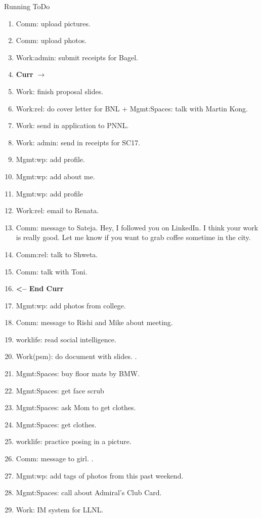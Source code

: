 \begin{columns}
\begin{column}{0.6\linewidth}
\begin{block}{Running ToDo}
\begin{enumerate}
\item \tiny Comm: upload pictures. 
\item \tiny Comm: upload photos. 

\item \tiny Work:admin: submit receipts for Bagel. 

  
\tiny \item[] \tiny \textbf{Curr} $\rightarrow$
  
\item \tiny Work: finish proposal slides. 

\item \tiny Work:rel: do cover letter for BNL + Mgmt:Spaces: talk with
  Martin Kong.
  
\item \tiny Work: send in application to PNNL.

\item \tiny Work: admin: send in receipts for SC17. 

\item \tiny Mgmt:wp: add profile.
\item \tiny Mgmt:wp: add about me. 
  
\item \tiny Mgmt:wp: add profile 
\item \tiny Work:rel: email to Renata.  
\item \tiny Comm: message to Sateja. 
  Hey, I followed you on LinkedIn. I think your work is really good. 
  Let me know if you want to grab coffee sometime in the city. 
\item \tiny Comm:rel: talk to Shweta.
\item \tiny Comm: talk with Toni. 

\item \tiny \textbf{ <-- End Curr }
      \item \tiny Mgmt:wp: add photos from college. 
      \item \tiny Comm: message to Rishi and Mike about meeting. 
      \item \tiny worklife: read social intelligence.  
      \item \tiny Work(psm): do document with slides. .
      \item \tiny Mgmt:Spaces: buy floor mats by BMW. 
      \item \tiny Mgmt:Spaces: get face scrub
      \item \tiny Mgmt:Spaces: ask Mom to get clothes.
      \item \tiny Mgmt:Spaces: get clothes. 
      \item \tiny worklife: practice posing in a picture.  
      \item \tiny Comm: message to girl.  . 
      \item \tiny Mgmt:wp: add tags of photos from this past weekend.  
      \item \tiny Mgmt:Spaces: call about Admiral's Club Card.
      \item \tiny Work: IM system for LLNL. 
        

\end{enumerate}
\end{block}
\end{column}
\end{columns}
